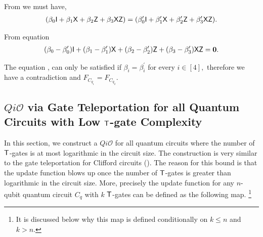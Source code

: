 From  we must have,
\begin{equation}
\label{lemma:1qubit:eq4}
\begin{aligned}
(\beta_0 {\sf I}+\beta_1 {\sf X}+\beta_2 {\sf Z}+\beta_3 {\sf X} {\sf Z}) =(\beta_0^\prime {\sf I}+\beta_1^\prime {\sf X}+\beta_2^\prime {\sf Z}+\beta_3^\prime {\sf X} {\sf Z}).\\
\end{aligned}
\end{equation}

From equation 
\begin{equation}
\label{lemma:1qubit:eq5}
\begin{aligned}
(\beta_0-\beta_0^\prime) {\sf I}+(\beta_1 -\beta_1^\prime){\sf X}+(\beta_2-\beta_2^\prime) {\sf Z}+(\beta_3-\beta^\prime_3) {\sf X} {\sf Z}={\bf 0}.
\end{aligned}
\end{equation}

The equation ,  can only be satisfied if $\beta_i = \beta_i^\prime$ for every $i\in[4],$ therefore we have a contradiction and $F_{C_{q_1}}=F_{C_{q_2}}.$



\subsection{$Qi\mathcal{O}$ via Gate Teleportation for all Quantum Circuits with Low ${\sf T}$-gate Complexity }
\label{sec:n-qubit-circuits}
In this section, we construct a $Qi\mathcal{O}$ for all quantum circuits where the number of ${\sf T}$-gates is at most logarithmic in the circuit size. The construction is very similar to the gate teleportation for Clifford circuits (). The reason for this bound is that the update function blows up once the number of ${\sf T}$-gates is greater than logarithmic in the circuit size. More, precisely the update function for any $n$-qubit quantum circuit $C_q$ with $k$ ${\sf T}$-gates can be defined as the following map. \footnote{It is discussed below why this map is defined conditionally on $k\leq n$ and $k>n$.}


